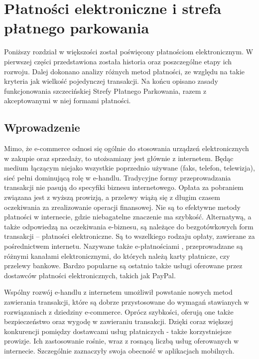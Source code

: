 \section{Płatności elektroniczne i strefa płatnego parkowania}

Poniższy rozdział w większości został poświęcony płatnościom elektronicznym. W pierwszej części przedstawiona została historia oraz poszczególne etapy ich rozwoju. Dalej dokonano analizy różnych metod płatności, ze względu na takie kryteria jak wielkość pojedynczej transakcji. Na końcu opisano zasady funkcjonowania szczecińskiej Strefy Płatnego Parkowania, razem z akceptowanymi w niej formami płatności.

\subsection{Wprowadzenie}

Mimo, że e-commerce odnosi się ogólnie do stosowania urządzeń elektronicznych w zakupie oraz sprzedaży, to utożsamiany jest głównie z internetem. Będąc medium łączącym niejako wszystkie poprzednio używane (faks, telefon, telewizja), sieć pełni dominującą rolę w e-handlu. Tradycyjne formy przeprowadzania transakcji nie pasują do specyfiki biznesu internetowego. Opłata za pobraniem związana jest z wyższą prowizją, a przelewy wiążą się z długim czasem oczekiwania za zrealizowanie operacji finansowej. Nie są to efektywne metody płatności w internecie, gdzie niebagatelne znaczenie ma szybkość. Alternatywą, a także odpowiedzą na oczekiwania e-biznesu, są należące do bezgotówkowych form transakcji -- płatności elektroniczne. Są to wszelkiego rodzaju opłaty, zawierane za pośrednictwem internetu. Nazywane także e-płatnościami 
\cite{elektroniczne_metody_platnosci}, przeprowadzane są różnymi kanałami 
elektronicznymi, do których należą karty płatnicze, czy przelewy bankowe. 
Bardzo popularne są ostatnio także usługi oferowane przez dostawców płatności 
elektronicznych, takich jak PayPal.

Wspólny rozwój e-handlu z internetem umożliwił powstanie nowych metod 
zawierania transakcji, które są dobrze przystosowane do wymagań 
stawianych w rozwiązaniach z dziedziny e-commerce. Oprócz szybkości, oferują 
one także bezpieczeństwo oraz wygodę w zawieraniu transakcji. Dzięki coraz 
większej konkurencji pomiędzy dostawcami usług płatniczych - także 
korzystniejsze prowizje. Ich zastosowanie rośnie, wraz z rosnącą liczbą usług 
oferowanych w internecie. Szczególnie zaznaczyły swoja obecność w aplikacjach 
mobilnych.

